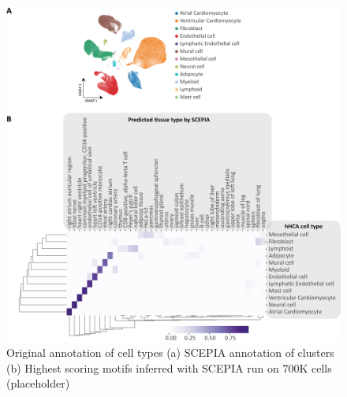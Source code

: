 \begin{figure}
    \centering
    \includegraphics[width=\linewidth]{ch.scepia/imgs/SCEPIA_Annotation_allCells_SuppFig1_v4.png}
    \caption{Original annotation of cell types (a) SCEPIA annotation of clusters (b) Highest scoring motifs inferred with SCEPIA run on 700K cells (placeholder) }
    \label{fig:scepia_annotation1}
\end{figure}

